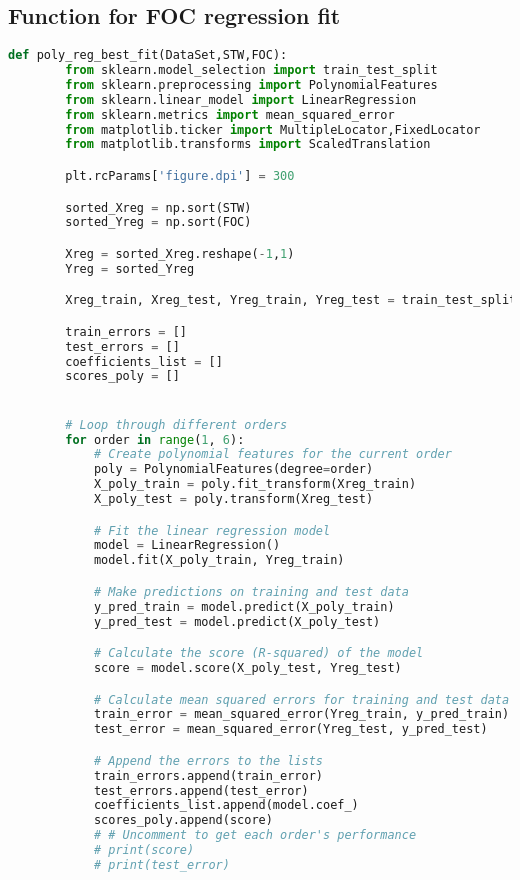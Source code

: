 \subsection*{Function for FOC regression fit}

\begin{lstlisting}[language=Python]
    def poly_reg_best_fit(DataSet,STW,FOC):
        from sklearn.model_selection import train_test_split
        from sklearn.preprocessing import PolynomialFeatures
        from sklearn.linear_model import LinearRegression
        from sklearn.metrics import mean_squared_error
        from matplotlib.ticker import MultipleLocator,FixedLocator
        from matplotlib.transforms import ScaledTranslation

        plt.rcParams['figure.dpi'] = 300

        sorted_Xreg = np.sort(STW)
        sorted_Yreg = np.sort(FOC)

        Xreg = sorted_Xreg.reshape(-1,1)
        Yreg = sorted_Yreg

        Xreg_train, Xreg_test, Yreg_train, Yreg_test = train_test_split(Xreg, Yreg, test_size=0.25, random_state=42)

        train_errors = []
        test_errors = []
        coefficients_list = []
        scores_poly = []


        # Loop through different orders
        for order in range(1, 6):
            # Create polynomial features for the current order
            poly = PolynomialFeatures(degree=order)
            X_poly_train = poly.fit_transform(Xreg_train)
            X_poly_test = poly.transform(Xreg_test)

            # Fit the linear regression model
            model = LinearRegression()
            model.fit(X_poly_train, Yreg_train)

            # Make predictions on training and test data
            y_pred_train = model.predict(X_poly_train)
            y_pred_test = model.predict(X_poly_test)

            # Calculate the score (R-squared) of the model
            score = model.score(X_poly_test, Yreg_test)

            # Calculate mean squared errors for training and test data
            train_error = mean_squared_error(Yreg_train, y_pred_train)
            test_error = mean_squared_error(Yreg_test, y_pred_test)

            # Append the errors to the lists
            train_errors.append(train_error)
            test_errors.append(test_error)
            coefficients_list.append(model.coef_)
            scores_poly.append(score)
            # # Uncomment to get each order's performance
            # print(score)
            # print(test_error)
        

\end{lstlisting}
